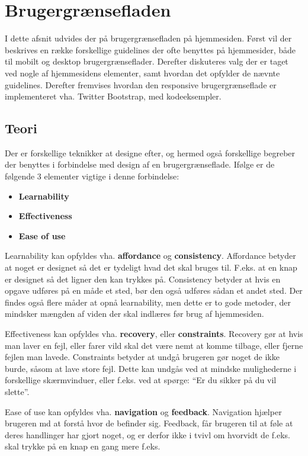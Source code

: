 \section{Brugergrænsefladen} \label{brugergraenseflade}
I dette afsnit udvides der på brugergrænsefladen på hjemmesiden.
Først vil der beskrives en række forskellige guidelines der ofte benyttes på hjemmesider, både til mobilt og desktop brugergrænseflader.
Derefter diskuteres valg der er taget ved nogle af hjemmesidens elementer, samt hvordan det opfylder de nævnte guidelines.
Derefter fremvises hvordan den responsive brugergrænseflade er implementeret vha. Twitter Bootstrap, med kodeeksempler. 

\subsection{Teori}

Der er forskellige teknikker at designe efter, og hermed også forskellige begreber der benyttes i forbindelse med design af en brugergrænseflade.
Ifølge \citep{DIS2014} er de følgende 3 elementer vigtige i denne forbindelse:
\begin{itemize}
	\item \textbf{Learnability}
	\item \textbf{Effectiveness}
	\item \textbf{Ease of use}
\end{itemize}

Learnability kan opfyldes vha. \textbf{affordance} og \textbf{consistency}.
Affordance betyder at noget er designet så det er tydeligt hvad det skal bruges til.
F.eks. at en knap er designet så det ligner den kan trykkes på. 
Consistency betyder at hvis en opgave udføres på en måde et sted, bør den også udføres sådan et andet sted.
Der findes også flere måder at opnå learnability, men dette er to gode metoder, der mindsker mængden af viden der skal indlæres før brug af hjemmesiden.

Effectiveness kan opfyldes vha. \textbf{recovery}, eller \textbf{constraints}.
Recovery gør at hvis man laver en fejl, eller farer vild skal det være nemt at komme tilbage, eller fjerne fejlen man lavede.
Constraints betyder at undgå brugeren gør noget de ikke burde, såsom at lave store fejl. 
Dette kan undgås ved at mindske mulighederne i forskellige skærmvinduer, eller f.eks. ved at spørge: ``Er du sikker på du vil slette''.

Ease of use kan opfyldes vha. \textbf{navigation} og \textbf{feedback}.
Navigation hjælper brugeren md at forstå hvor de befinder sig.
Feedback, får brugeren til at føle at deres handlinger har gjort noget, og er derfor ikke i tvivl om hvorvidt de f.eks. skal trykke på en knap en gang mere f.eks.


